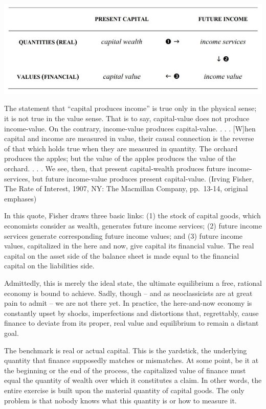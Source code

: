 \documentclass[
]{book}
\begin{document}
\includegraphics{fig/fisher_house_of_mirrors.jpg}

The statement that ``capital produces income'' is true only in the physical sense; it is not true in the value sense. That is to say, capital-value does not produce income-value. On the contrary, income-value produces capital-value. . . . {[}W{]}hen capital and income are measured in value, their causal connection is the reverse of that which holds true when they are measured in quantity. The orchard produces the apples; but the value of the apples produces the value of the orchard. . . . We see, then, that present capital-wealth produces future income-services, but future income-value produces present capital-value. (Irving Fisher, The Rate of Interest, 1907, NY: The Macmillan Company, pp.~13-14, original emphases)

In this quote, Fisher draws three basic links:
(1) the stock of capital goods, which economists consider as wealth, generates future income services;
(2) future income services generate corresponding future income values; and
(3) future income values, capitalized in the here and now, give capital its financial value.
The real capital on the asset side of the balance sheet is made equal to the financial capital on the liabilities side.

Admittedly, this is merely the ideal state, the ultimate equilibrium a free, rational economy is bound to achieve. Sadly, though -- and as neoclassicists are at great pain to admit -- we are not there yet. In practice, the here-and-now economy is constantly upset by shocks, imperfections and distortions that, regrettably, cause finance to deviate from its proper, real value and equilibrium to remain a distant goal.

The benchmark is real or actual capital. This is the yardstick, the underlying quantity that finance supposedly matches or mismatches. At some point, be it at the beginning or the end of the process, the capitalized value of finance must equal the quantity of wealth over which it constitutes a claim. In other words, the entire exercise is built upon the material quantity of capital goods. The only problem is that nobody knows what this quantity is or how to measure it.
\end{document}
